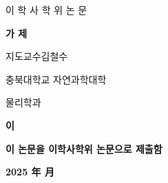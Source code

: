 \begin{titlepage}

\begin{center}
    \Large{이 학 사 학 위 논 문}
    \vspace{1cm}
    
    \textbf{\LARGE 가 제}
    \vspace{5.5cm}

    \Large{
    지도교수\quad 김\quad 철\quad 수

    \vspace{1cm}
    충북대학교 자연과학대학

    \vspace{0.5cm}
    물리학과

    \vspace{1cm}
    \textbf{이}}

    \vspace{1cm}
    \textbf{\large 이 논문을 이학사학위 논문으로 제출함}
    
    \vspace{1cm}
    \large{\textbf{2025 年 月}}
    
\end{center}
    
    
    
\end{titlepage}
